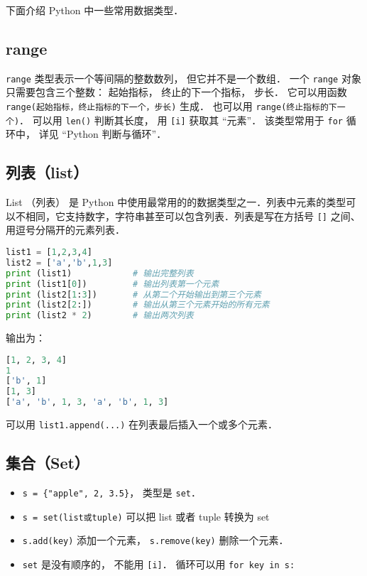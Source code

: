 

下面介绍 Python 中一些常用数据类型． 

\subsection{range}
\verb|range| 类型表示一个等间隔的整数数列， 但它并不是一个数组． 一个 \verb|range| 对象只需要包含三个整数： 起始指标， 终止的下一个指标， 步长． 它可以用函数 \verb|range(起始指标，终止指标的下一个，步长)| 生成． 也可以用 \verb|range(终止指标的下一个)|． 可以用 \verb|len()| 判断其长度， 用 \verb|[i]| 获取其 “元素”． 该类型常用于 \verb|for| 循环中， 详见 “Python 判断与循环”．

\subsection{列表（list）}
List （列表） 是 Python 中使用最常用的的数据类型之一．列表中元素的类型可以不相同，它支持数字，字符串甚至可以包含列表．列表是写在方括号 \verb|[]| 之间、用逗号分隔开的元素列表．
\begin{lstlisting}[language=python]
list1 = [1,2,3,4]
list2 = ['a','b',1,3]
print (list1)            # 输出完整列表
print (list1[0])         # 输出列表第一个元素
print (list2[1:3])       # 从第二个开始输出到第三个元素
print (list2[2:])        # 输出从第三个元素开始的所有元素
print (list2 * 2)        # 输出两次列表
\end{lstlisting}
输出为：
\begin{lstlisting}[language=python]
[1, 2, 3, 4]
1
['b', 1]
[1, 3]
['a', 'b', 1, 3, 'a', 'b', 1, 3]
\end{lstlisting}
可以用 \verb|list1.append(...)| 在列表最后插入一个或多个元素．

\subsection{集合（Set）}
\begin{itemize}
\item \verb|s = {"apple", 2, 3.5}|， 类型是 \verb|set|． 
\item \verb|s = set(list或tuple)| 可以把 list 或者 tuple 转换为 set
\item \verb|s.add(key)| 添加一个元素， \verb|s.remove(key)| 删除一个元素．
\item \verb|set| 是没有顺序的， 不能用 \verb|[i]|． 循环可以用 \verb|for key in s:|
\end{itemize}


